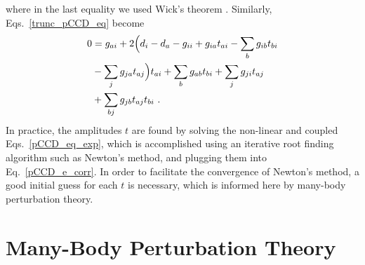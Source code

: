 \documentclass[aps,pre,floatfix,showpacs,twocolumn, preprintnumbers]{revtex4-1}
\begin{document}
where in the last equality we used Wick's theorem \cite{Wick1950}. Similarly, Eqs.~\eqref{trunc_pCCD_eq} become
\begin{align}
\label{pCCD_eq_exp}
0& =g_{ai}+2\Big{(}d_i-d_a-g_{ii}+g_{ia}t_{ai}-\sum_b g_{ib}t_{bi}\nonumber\\
&-\sum_jg_{ja}t_{aj}\Big{)}t_{ai}+\sum_bg_{ab}t_{bi}+\sum_jg_{ji}t_{aj}\nonumber\\
&+\sum_{bj}g_{jb}t_{aj}t_{bi}\ .
\end{align}
In practice, the amplitudes $t$ are found by solving the non-linear and coupled Eqs.~\eqref{pCCD_eq_exp}, which is accomplished using an iterative root finding algorithm such as Newton's method, and plugging them into Eq.~\eqref{pCCD_e_corr}. In order to facilitate the convergence of Newton's method, a good initial guess for each $t$ is necessary, which is informed here by many-body perturbation theory.

\section{Many-Body Perturbation Theory}\label{sec:manybody}
\end{document}
